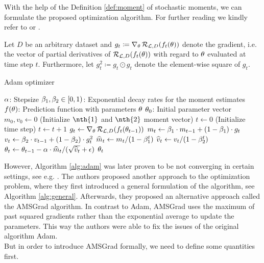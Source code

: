 With the help of the Definition \ref{def:moment} of stochastic moments, we can formulate the proposed optimization algorithm. For further reading we kindly refer to \cite{kingma2014adam} or \cite[Chapter~8]{goodfellow2016deep}.

\begin{algorithm}[H]
Let $D$ be an arbitrary dataset and $g_t\coloneqq \nabla_{\theta}\operatorname{\mathcal{R}}_{\operatorname{\mathcal{L}}, D}(f_t(\theta))$ denote the gradient, i.e. the vector of partial derivatives of $\operatorname{\mathcal{R}}_{\operatorname{\mathcal{L}}, D}(f_t(\theta))$ with regard to $\theta$ evaluated at time step $t$. Furthermore,  let $g_t^2 \coloneqq g_t \odot g_t$ denote the element-wise square of $g_t$.
\caption{Adam optimizer}\label{alg:adam}
\begin{algorithmic}[1]
\Require $\alpha$: Stepsize
\Require $\beta_1,\beta_2\in [0,1)$: Exponential decay rates for the moment estimates
\Require $f(\theta)$: Prediction function with parameters $\theta$
\Require $\theta_0$: Initial parameter vector
\State $m_0,v_0 \gets 0$ (Initialize $\nth{1}$ and $\nth{2}$ moment vector)
\State $t \gets 0$ (Initialize time step)
\State $t\gets t+1$
\State $g_t \gets \nabla_{\theta}\operatorname{\mathcal{R}}_{\operatorname{\mathcal{L}}, D}(f_t(\theta_{t-1}))$ 
\State $m_t \gets\beta_1 \cdot m_{t-1} + (1-\beta_1)\cdot g_t$ 
\State $v_t \gets\beta_2 \cdot v_{t-1} + (1-\beta_2)\cdot g_t^2$ 
\State $\widehat{m}_t \gets m_t/(1-\beta_1^t)$ 
\State $\widehat{v}_t \gets v_t/(1-\beta_2^t)$ 
\State $\theta_t \gets \theta_{t-1} - \alpha\cdot \widehat{m}_t / (\sqrt{\widehat{v}_t} + \operatorname{\epsilon})$ 
\EndWhile
\State \Return $\theta_t$ 
\end{algorithmic}
\end{algorithm}

However, Algorithm \ref{alg:adam} was later proven to be not converging in certain settings, see e.g. \cite{reddi2019convergence}. The authors proposed another approach to the optimization problem, where they first introduced a general formulation of the algorithm, see Algorithm \ref{alg:general}. Afterwards, they proposed an alternative approach called the AMSGrad algorithm. In contrast to Adam, AMSGrad uses the maximum of past squared gradients rather than the exponential average to update the parameters. This way the authors were able to fix the issues of the original algorithm Adam.\\
But in order to introduce AMSGrad formally, we need to define some quantities first.

